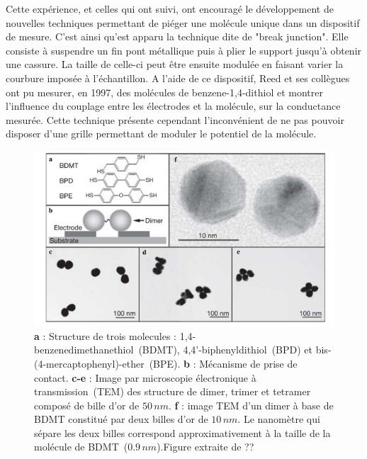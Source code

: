 Cette expérience, et celles qui ont suivi, ont encouragé le développement de nouvelles techniques permettant de piéger une molécule unique dans un dispositif de mesure. C'est ainsi qu'est apparu la technique dite de "break junction". Elle consiste à suspendre un fin pont métallique puis à plier le support jusqu'à obtenir une cassure. La taille de celle-ci peut être ensuite modulée en faisant varier la courbure imposée à l'échantillon. A l'aide de ce dispositif, Reed et ses collègues ont pu mesurer, en 1997, des molécules de benzene-1,4-dithiol et montrer l'influence du couplage entre les électrodes et la molécule, sur la conductance mesurée. Cette technique présente cependant l'inconvénient de ne pas pouvoir disposer d'une grille permettant de moduler le potentiel de la molécule.

\begin{figure}
\centering \includegraphics[scale=0.45]{Spintronique/MolSpintro2/MolSpintro2.pdf}
\caption{\textbf{a} : Structure de trois molecules : 1,4-benzenedimethanethiol~(BDMT), 4,4'-biphenyldithiol~(BPD) et bis-(4-mercaptophenyl)-ether~(BPE). \textbf{b} : Mécanisme de prise de contact. \textbf{c-e} : Image par microscopie électronique à transmission~(TEM) des structure de dimer, trimer et tetramer composé de bille d'or de $50\,nm$. \textbf{f} : image TEM d'un dimer à base de BDMT constitué par deux billes d'or de $10\,nm$. Le nanomètre qui sépare les deux billes correspond approximativement à la taille de la molécule de BDMT~($0.9\,nm$).Figure extraite de ??}
\label{MolSpintro2}
\end{figure}


